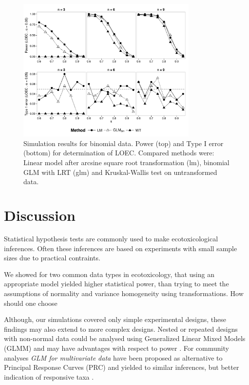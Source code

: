 \documentclass{scrartcl}
\begin{document}
\begin{figure}[h]
  \centering
  \includegraphics[width = 0.8\textwidth]{p_loec_p.pdf}
  \caption{Simulation results for binomial data. Power (top) and Type I error (bottom) for determination of LOEC. Compared methods were: Linear model after arcsine square root transformation (lm), binomial GLM with LRT (glm) and Kruskal-Wallis test on untransformed data.}
  \label{fig:p_loec_p}
\end{figure}



\section{Discussion}
Statistical hypothesis tests are commonly used to make ecotoxicological inferences. 
Often these inferences are based on experiments with small sample sizes due to practical contraints.

We showed for two common data types in ecotoxicology, that using an appropriate model yielded higher statistical power, than trying to meet the assumptions of normality and variance homogeneity using transformations. 
How should one choose 



Although, our simulations covered only simple experimental designs, these findings may also extend to more complex designs. 
Nested or repeated designs with non-normal data could be analysed using Generalized Linear Mixed Models (GLMM) and may have advantages with respect to power \citep{stroup_rethinking_2014}.
For community analyses \emph{GLM for multivariate data} have been proposed as alternative to Principal Response Curves (PRC) and yielded to similar inferences, but better indication of responsive taxa \citep{warton_distance-based_2012,szocs_analysing_2015}.
\end{document}
